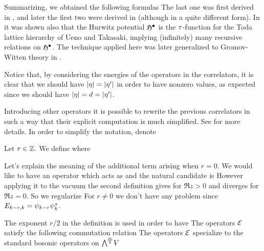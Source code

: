 \documentclass[../main/main.tex]{subfiles}
\begin{document}
Summarizing, we obtained the following formulas
The last one was first derived in \cite{O1}, and later the first two were derived in \cite{OP1} (although in a quite different form). In \cite{O1} it was shown also that the Hurwitz potential $\mathfrak H^\bullet$ is the $\tau$-function for the Toda lattice hierarchy of Ueno and Takasaki, implying (infinitely) many recursive relations on $\mathfrak H^\bullet$. The technique applied here was later generalized to Gromov-Witten theory in \cite{OP1,OP2}. 

Notice that, by considering the energies of the operators in the correlators, it is clear that we should have $|\eta|=|\eta'|$ in order to have nonzero values, as expected since we should have $|\eta|=d=|\eta'|$. 

Introducing other operators it is possible to rewrite the previous correlators in such a way that their explicit computation is much simplified. See \cite{J,OP1,OP2} for more details. In order to simplify the notation, denote

\begin{definition}
	Let $r\in\mathbb Z$. We define
	where
\end{definition}

Let's explain the meaning of the additional term arising when $r=0$. We would like to have an operator which acts as
and the natural candidate is 
However applying it to the vacuum the second definition gives for $\Re z>0$
and diverges for $\Re z=0$. So we regularize
For $r\neq0$ we don't have any problem since $E_{k-r,k}=\psi_{k-r}\psi_k^*$.

The exponent $r/2$ in the definition is used in order to have
The operators $\mathcal E$ satisfy the following commutation relation
The operators $\mathcal E$ specialize to the standard bosonic operators on $\bigwedge^{\!\frac\infty2}\!V$
\end{document}
